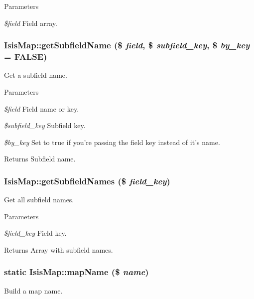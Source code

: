 \begin{DoxyParams}{Parameters}
\item[{\em \$field}]Field array. \end{DoxyParams}
\hypertarget{classIsisMap_a58d739ea1f014befdafef7035d46c074}{
\subsubsection[{getSubfieldName}]{\setlength{\rightskip}{0pt plus 5cm}IsisMap::getSubfieldName (\$ {\em field}, \/  \$ {\em subfield\_\-key}, \/  \$ {\em by\_\-key} = {\ttfamily FALSE})}}
\label{classIsisMap_a58d739ea1f014befdafef7035d46c074}
Get a subfield name.


\begin{DoxyParams}{Parameters}
\item[{\em \$field}]Field name or key.\item[{\em \$subfield\_\-key}]Subfield key.\item[{\em \$by\_\-key}]Set to true if you're passing the field key instead of it's name.\end{DoxyParams}
\begin{DoxyReturn}{Returns}
Subfield name. 
\end{DoxyReturn}
\hypertarget{classIsisMap_a1f30d131831b036271b0a1ff6d5d9d68}{
\subsubsection[{getSubfieldNames}]{\setlength{\rightskip}{0pt plus 5cm}IsisMap::getSubfieldNames (\$ {\em field\_\-key})}}
\label{classIsisMap_a1f30d131831b036271b0a1ff6d5d9d68}
Get all subfield names.


\begin{DoxyParams}{Parameters}
\item[{\em \$field\_\-key}]Field key.\end{DoxyParams}
\begin{DoxyReturn}{Returns}
Array with subfield names. 
\end{DoxyReturn}
\hypertarget{classIsisMap_a7f1b9b1cce7a02dea704a40ca85e2117}{
\subsubsection[{mapName}]{\setlength{\rightskip}{0pt plus 5cm}static IsisMap::mapName (\$ {\em name})}}
\label{classIsisMap_a7f1b9b1cce7a02dea704a40ca85e2117}
Build a map name.


